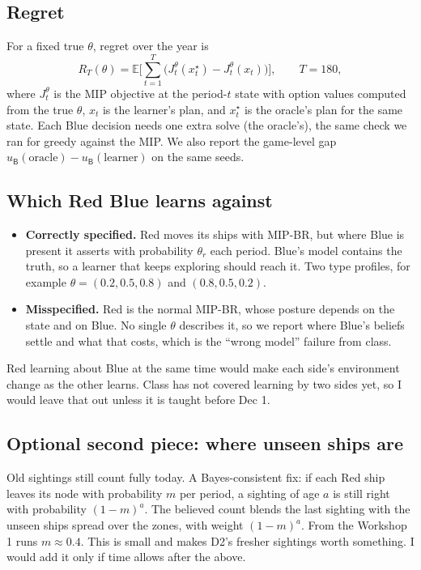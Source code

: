 \documentclass[10pt]{article}
\newcommand{\B}{\mathsf{B}}
\newcommand{\1}{\mathbf{1}}
\begin{document}
\subsection{Regret}
For a fixed true $\theta$, regret over the year is
\[
R_T(\theta)=\mathbb E\Big[\sum_{t=1}^{T}\big(J^\theta_t(x^\star_t)-J^\theta_t(x_t)\big)\Big],\qquad T=180,
\]
where $J^\theta_t$ is the MIP objective at the period-$t$ state with option values computed from the true $\theta$,
$x_t$ is the learner's plan, and $x^\star_t$ is the oracle's plan for the same state. Each Blue decision needs one
extra solve (the oracle's), the same check we ran for greedy against the MIP. We also report the game-level gap
$u_\B(\text{oracle})-u_\B(\text{learner})$ on the same seeds.

\subsection{Which Red Blue learns against}
\begin{itemize}
\item \textbf{Correctly specified.} Red moves its ships with MIP-BR, but where Blue is present it asserts with
probability $\theta_r$ each period. Blue's model contains the truth, so a learner that keeps exploring should reach
it. Two type profiles, for example $\theta=(0.2,0.5,0.8)$ and $(0.8,0.5,0.2)$.
\item \textbf{Misspecified.} Red is the normal MIP-BR, whose posture depends on the state and on Blue. No single
$\theta$ describes it, so we report where Blue's beliefs settle and what that costs, which is the ``wrong model''
failure from class.
\end{itemize}
Red learning about Blue at the same time would make each side's environment change as the other learns. Class has
not covered learning by two sides yet, so I would leave that out unless it is taught before Dec 1.

\subsection{Optional second piece: where unseen ships are}
Old sightings still count fully today. A Bayes-consistent fix: if each Red ship leaves its node with probability $m$
per period, a sighting of age $a$ is still right with probability $(1-m)^a$. The believed count blends the last
sighting with the unseen ships spread over the zones, with weight $(1-m)^a$. From the Workshop 1 runs $m\approx0.4$.
This is small and makes D2's fresher sightings worth something. I would add it only if time allows after the above.
\end{document}
